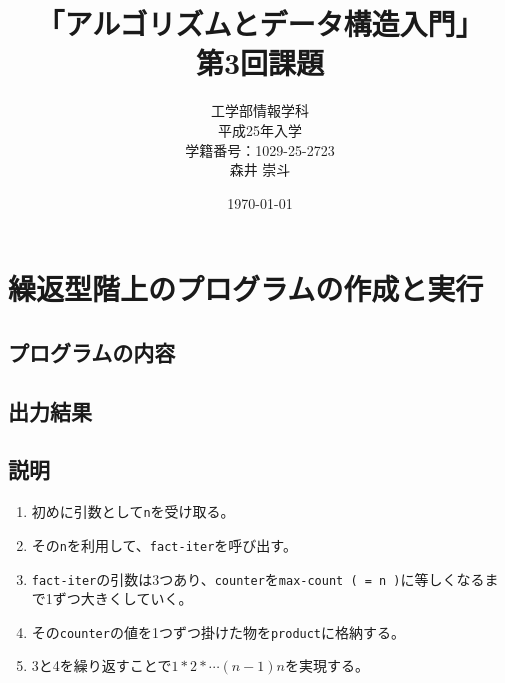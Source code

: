 \documentclass[a4paper,12pt]{article}
\begin{document}
\title{「アルゴリズムとデータ構造入門」\\
第3回課題}
\author{工学部情報学科\\
平成25年入学\\
学籍番号：1029-25-2723\\
森井 崇斗 }
\date{\today}
\maketitle

\lstset{numbers=left,basicstyle=\ttfamily\small,
  commentstyle=\textit, keywordstyle=\bfseries}
  \section{繰返型階上のプログラムの作成と実行}
  \subsection{プログラムの内容}



\subsection{出力結果}


\subsection{説明}

\begin{enumerate}
    \item 初めに引数として{\tt n}を受け取る。
    \item その{\tt n}を利用して、{\tt fact-iter}を呼び出す。
    \item {\tt fact-iter}の引数は3つあり、{\tt counter}を{\tt max-count ( = n )}に等しくなるまで1ずつ大きくしていく。
    \item その{\tt counter}の値を1つずつ掛けた物を{\tt product}に格納する。
    \item 3と4を繰り返すことで$ 1*2*\cdots(n-1)n $を実現する。
\end{enumerate}
\end{document}
